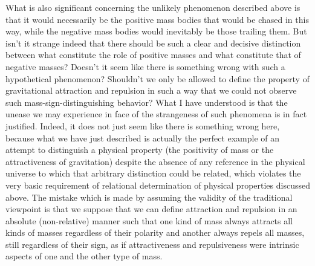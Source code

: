 \documentclass[notitlepage,12pt]{report}
\begin{document}
What is also significant concerning the unlikely phenomenon described above is that it would necessarily be the positive mass bodies that would be chased in this way, while the negative mass bodies would inevitably be those trailing them. But isn't it strange indeed that there should be such a clear and decisive distinction between what constitute the role of positive masses and what constitute that of negative masses? Doesn't it seem like there is something wrong with such a hypothetical phenomenon? Shouldn't we only be allowed to define the property of gravitational attraction and repulsion in such a way that we could not observe such mass-sign-distinguishing behavior? What I have understood is that the unease we may experience in face of the strangeness of such phenomena is in fact justified. Indeed, it does not just seem like there is something wrong here, because what we have just described is actually the perfect example of an attempt to distinguish a physical property (the positivity of mass or the attractiveness of gravitation) despite the absence of any reference in the physical universe to which that arbitrary distinction could be related, which violates the very basic requirement of relational determination of physical properties discussed above. The mistake which is made by assuming the validity of the traditional viewpoint is that we suppose that we can define attraction and repulsion in an absolute (non-relative) manner such that one kind of mass always attracts all kinds of masses regardless of their polarity and another always repels all masses, still regardless of their sign, as if attractiveness and repulsiveness were intrinsic aspects of one and the other type of mass.
\end{document}
